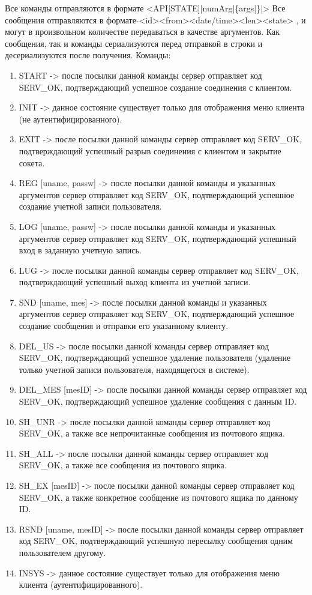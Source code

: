 Все команды отправляются в формате <API[STATE]|numArg|\{args|\}|>
Все сообщения отправляются в формате $\hat{}$<id>$\hat{}$<from>$\hat{}$<date/time>$\hat{}$<len>$\hat{}$<state>$\hat{}$ , и могут в произвольном количестве передаваться в качестве аргументов. Как сообщения, так и команды сериализуются перед отправкой в строки и десериализуются после получения.
Команды: 
\begin{enumerate}
\item START -> после посылки данной команды сервер отправляет код SERV\_OK, подтверждающий успешное создание соединения с клиентом.
\item INIT -> данное состояние существует только для отображения меню клиента (не аутентифицированного).
\item EXIT -> после посылки данной команды сервер отправляет код SERV\_OK, подтверждающий успешный разрыв соединения с клиентом и закрытие сокета.
\item REG [uname, passw] -> после посылки данной команды и указанных аргументов сервер отправляет код SERV\_OK, подтверждающий успешное создание учетной записи пользователя.
\item LOG [uname, passw] -> после посылки данной команды и указанных аргументов сервер отправляет код SERV\_OK, подтверждающий успешный вход в заданную учетную запись.
\item LUG -> после посылки данной команды сервер отправляет код SERV\_OK, подтверждающий успешный выход клиента из учетной записи.
\item SND [uname, mes] -> после посылки данной команды и указанных аргументов сервер отправляет код SERV\_OK, подтверждающий успешное создание сообщения и отправки его указанному клиенту.
\item DEL\_US -> после посылки данной команды сервер отправляет код SERV\_OK, подтверждающий успешное удаление пользователя (удаление только учетной записи пользователя, находящегося в системе).
\item DEL\_MES [mesID] -> после посылки данной команды сервер отправляет код SERV\_OK, подтверждающий успешное удаление сообщения с данным ID.
\item SH\_UNR -> после посылки данной команды сервер отправляет код SERV\_OK, а также все непрочитанные сообщения из почтового ящика.
\item SH\_ALL -> после посылки данной команды сервер отправляет код SERV\_OK, а также все сообщения из почтового ящика.
\item SH\_EX [mesID] -> после посылки данной команды сервер отправляет код SERV\_OK, а также конкретное сообщение из почтового ящика по данному ID.
\item RSND [uname, mesID] -> после посылки данной команды сервер отправляет код SERV\_OK, подтверждающий успешную пересылку сообщения одним пользователем другому. 
\item INSYS -> данное состояние существует только для отображения меню клиента (аутентифицированного).
\end{enumerate}

